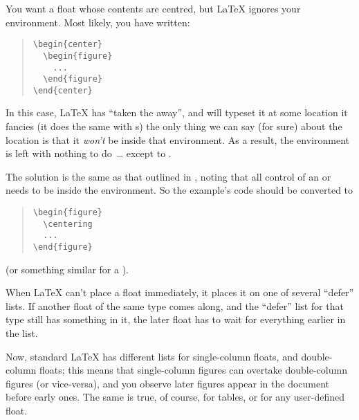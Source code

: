 
You want a float whose contents are centred, but \LaTeX{} ignores your
 environment.  Most likely, you have written:
\begin{quote}
\begin{verbatim}
\begin{center}
  \begin{figure}
    ...
  \end{figure}
\end{center}
\end{verbatim}
\end{quote}
In this case, \LaTeX{} has ``taken the  away'',
and will typeset it at some location it fancies (it does the same with
s) the only thing we can say (for sure) about the
location is that it \emph{won't} be inside that 
environment.  As a result, the  environment is
left with nothing to do~\dots{} except to %
.

The solution is the same as that outlined in %
, noting that all control of
an  or  needs to be
inside the environment.  So the example's code should be converted to
\begin{quote}
\begin{verbatim}
\begin{figure}
  \centering
  ...
\end{figure}
\end{verbatim}
\end{quote}
(or something similar for a ).


When \LaTeX{} can't place a float immediately, it places it on one of
several ``defer'' lists.  If another float of the same type comes
along, and the ``defer'' list for that type still has something in it,
the later float has to wait for everything earlier in the list.

Now, standard \LaTeX{} has different lists for single-column floats,
and double-column floats; this means that single-column figures can
overtake double-column figures (or vice-versa), and you observe later
figures appear in the document before early ones.  The same is true,
of course, for tables, or for any user-defined float.

